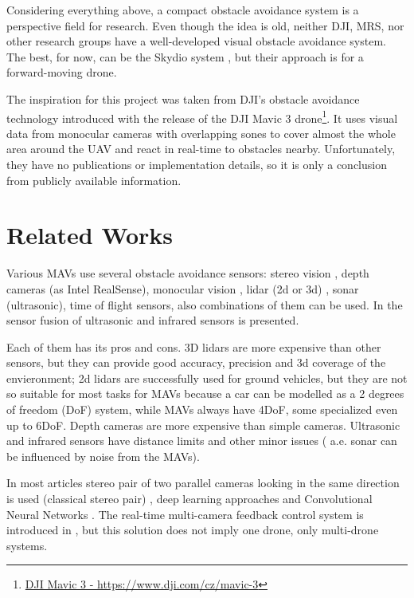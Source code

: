 Considering everything above, a compact obstacle avoidance system is a perspective field for research. 
Even though the idea is old, neither DJI, MRS, nor other research groups have a well-developed visual obstacle avoidance system. 
The best, for now, can be the Skydio system , but their approach is for a forward-moving drone.

The inspiration for this project was taken from DJI's obstacle avoidance technology introduced with the release of the DJI Mavic 3 drone\footnote{\href{https://www.dji.com/cz/mavic-3}{DJI Mavic 3 - https://www.dji.com/cz/mavic-3}}. 
It uses visual data from monocular cameras with overlapping sones to cover almost the whole area around the UAV and react in real-time to obstacles nearby. 
Unfortunately, they have no publications or implementation details, so it is only a conclusion from publicly available information.

\section{Related Works}
Various MAVs use several obstacle avoidance sensors: stereo vision \cite{Ruf2018}, depth cameras (as Intel RealSense), monocular vision \cite{Mejias2010}, lidar (2d or 3d) \cite{Ramasamy2016}, sonar (ultrasonic), time of flight sensors, also combinations of them can be used. 
In \cite{Rambabu2015} the sensor fusion of ultrasonic and infrared sensors is presented.

Each of them has its pros and cons. 
3D lidars are more expensive than other sensors, but they can provide good accuracy, precision and 3d coverage of the envieronment; 2d lidars are successfully used for ground vehicles, but they are not so suitable for most tasks for MAVs because a car can be modelled as a 2 degrees of freedom (DoF) system, while MAVs always have 4DoF, some specialized even up to 6DoF. 
Depth cameras are more expensive than simple cameras. Ultrasonic and infrared sensors have distance limits and other minor issues ( a.e. sonar can be influenced by noise from the MAVs). 

In most articles stereo pair of two parallel cameras looking in the same direction is used (classical stereo pair) \cite{Yu2018, Lin2021, Xiao2019}, deep learning approaches \cite{Back2020, FragaLamas2019, Park2020, Roghair2021} and Convolutional Neural Networks \cite{Yu2013, Ma2020}. 
The real-time multi-camera feedback control system is introduced in \cite{He2021}, but this solution does not imply one drone, only multi-drone systems.

